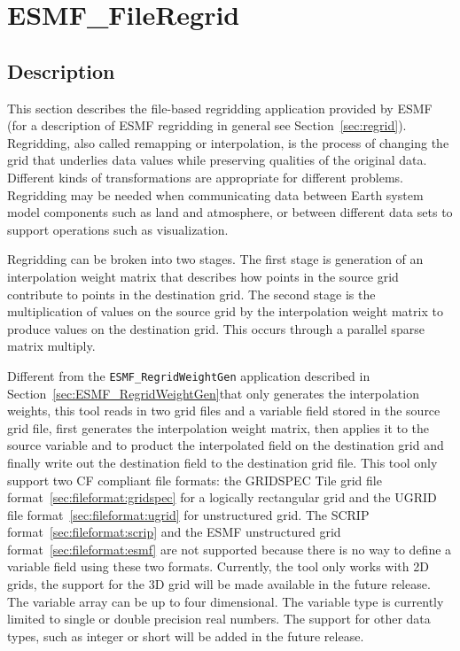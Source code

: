 
\section{ESMF\_FileRegrid}
\label{sec:ESMF_FileRegrid}

\subsection{Description}

This section describes the file-based regridding application provided by ESMF (for a description of ESMF regridding in general see Section~\ref{sec:regrid}). Regridding, also called remapping or interpolation, is the process of changing the grid that underlies data values while preserving qualities of the original data. Different kinds of transformations are appropriate for different problems. Regridding may be needed when communicating data between Earth system model components such as land and atmosphere, or between different data sets to support operations such as visualization. 

Regridding can be broken into two stages. The first stage is generation of an interpolation weight matrix that describes how points in
the source grid contribute to points in the destination grid. The second stage is the multiplication of values on the source grid by the
interpolation weight matrix to produce values on the destination grid. This occurs through a parallel sparse matrix multiply.

Different from the {\tt ESMF\_RegridWeightGen} application described in Section~\ref{sec:ESMF_RegridWeightGen}that only generates the interpolation weights, this tool reads in two grid files and a variable field stored in the source grid file, first generates the interpolation weight matrix, then applies it to the source
variable and to product the interpolated field on the destination grid and finally write out the destination
field to the destination grid file.  This tool only
support two CF compliant file formats: the GRIDSPEC Tile grid file format~\ref{sec:fileformat:gridspec} for
a logically rectangular grid and the UGRID file format~\ref{sec:fileformat:ugrid} for unstructured grid.  
The SCRIP format~\ref{sec:fileformat:scrip} and the ESMF unstructured grid format~\ref{sec:fileformat:esmf} are not supported because there is no way to define a variable field using these two formats. Currently, the tool only works with 2D grids, the support for the 3D grid will be 
made available in the future release.  The variable array can be up to four dimensional.  The
variable type is currently limited to single or double precision real numbers.  The support for 
other data types, such as integer or short will be added in the future release.  

